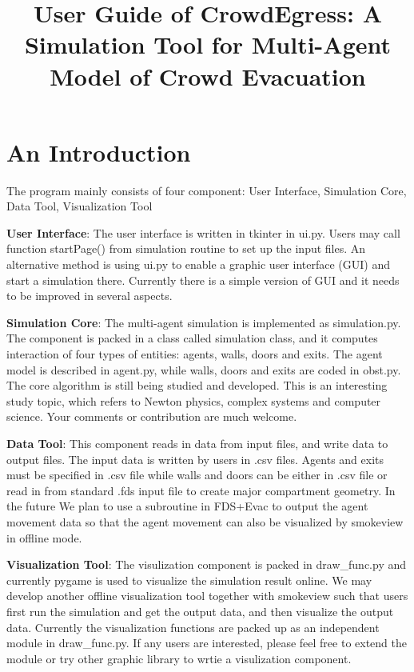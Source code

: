 \documentclass{article}
\begin{document}
\title{User Guide of CrowdEgress: A Simulation Tool for Multi-Agent Model of Crowd Evacuation}

\maketitle

\section{An Introduction}

The program mainly consists of four component: User Interface, Simulation Core, Data Tool, Visualization Tool

\textbf{User Interface}: The user interface is written in tkinter in ui.py.  Users may call function startPage() from simulation routine to set up the input files.  An alternative method is using ui.py to enable a graphic user interface (GUI) and start a simulation there.  Currently there is a simple version of GUI and it needs to be improved in several aspects.

\textbf{Simulation Core}: The multi-agent simulation is implemented as simulation.py.  The component is packed in a class called simulation class, and it computes interaction of four types of entities: agents, walls, doors and exits.  The agent model is described in agent.py, while walls, doors and exits are coded in obst.py.  The core algorithm is still being studied and developed.  This is an interesting study topic, which refers to Newton physics, complex systems and computer science.  Your comments or contribution are much welcome.

\textbf{Data Tool}: This component reads in data from input files, and write data to output files.  The input data is written by users in .csv files.  Agents and exits must be specified in .csv file while walls and doors can be either in .csv file or read in from standard .fds input file to create major compartment geometry.  In the future We plan to use a subroutine in FDS+Evac to output the agent movement data so that the agent movement can also be visualized by smokeview in offline mode.

\textbf{Visualization Tool}: The visulization component is packed in draw\_func.py and currently pygame is used to visualize the simulation result online.  We may develop another offline visualization tool together with smokeview such that users first run the simulation and get the output data, and then visualize the output data.  Currently the visualization functions are packed up as an independent module in draw\_func.py.  If any users are interested, please feel free to extend the module or try other graphic library to wrtie a visulization component.
\end{document}
